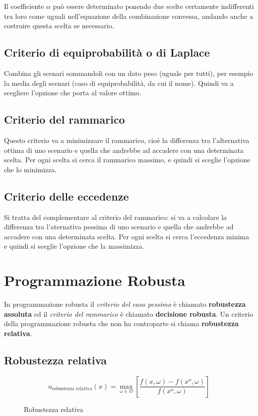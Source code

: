 \documentclass[\main/main.tex]{subfiles}
\begin{document}
Il coefficiente $\alpha$ può essere determinato ponendo due scelte certamente indifferenti tra loro come uguali nell'equazione della combinazione convessa, andando anche a costruire questa scelta se necessario.

\subsection{Criterio di equiprobabilità o di Laplace}
Combina gli scenari sommandoli con un dato peso (uguale per tutti), per esempio la media degli scenari (caso di equiprobabilità, da cui il nome). Quindi va a scegliere l'opzione che porta al valore ottimo.

\subsection{Criterio del rammarico}
Questo criterio va a minimizzare il rammarico, cioè la differenza tra l'alternativa ottima di uno scenario e quella che andrebbe ad accadere con una determinata scelta. Per ogni scelta si cerca il rammarico massimo, e quindi si sceglie l'opzione che lo minimizza.

\subsection{Criterio delle eccedenze}
Si tratta del complementare al criterio del rammarico: si va a calcolare la differenza tra l'aternativa pessima di uno scenario e quella che andrebbe ad accadere con una determinata scelta. Per ogni scelta si cerca l'eccedenza minima e quindi si sceglie l'opzione che la massimizza.

\section{Programmazione Robusta}
In programmazione robusta il \textit{criterio del caso pessimo} è chiamato \textbf{robustezza assoluta} ed il \textit{criterio del rammarico} è chiamato \textbf{decisione robusta}. Un criterio della programmazione robusta che non ha controparte si chiama \textbf{robustezza relativa}.

\subsection{Robustezza relativa}
\begin{figure}
  \[
    u_{\text{robustezza relativa}}(x) = \max_{\omega \in \Omega} \left[\frac{f(x, \omega) - f(x^o, \omega)}{f(x^o, \omega)}\right]
  \]
  \caption{Robustezza relativa}
\end{figure}
\end{document}
